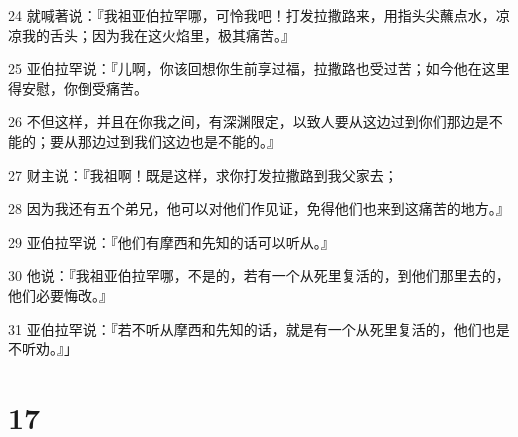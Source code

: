 \par 24 就喊著说：『我祖亚伯拉罕哪，可怜我吧！打发拉撒路来，用指头尖蘸点水，凉凉我的舌头；因为我在这火焰里，极其痛苦。』
\par 25 亚伯拉罕说：『儿啊，你该回想你生前享过福，拉撒路也受过苦；如今他在这里得安慰，你倒受痛苦。
\par 26 不但这样，并且在你我之间，有深渊限定，以致人要从这边过到你们那边是不能的；要从那边过到我们这边也是不能的。』
\par 27 财主说：『我祖啊！既是这样，求你打发拉撒路到我父家去；
\par 28 因为我还有五个弟兄，他可以对他们作见证，免得他们也来到这痛苦的地方。』
\par 29 亚伯拉罕说：『他们有摩西和先知的话可以听从。』
\par 30 他说：『我祖亚伯拉罕哪，不是的，若有一个从死里复活的，到他们那里去的，他们必要悔改。』
\par 31 亚伯拉罕说：『若不听从摩西和先知的话，就是有一个从死里复活的，他们也是不听劝。』」

\chapter{17}

